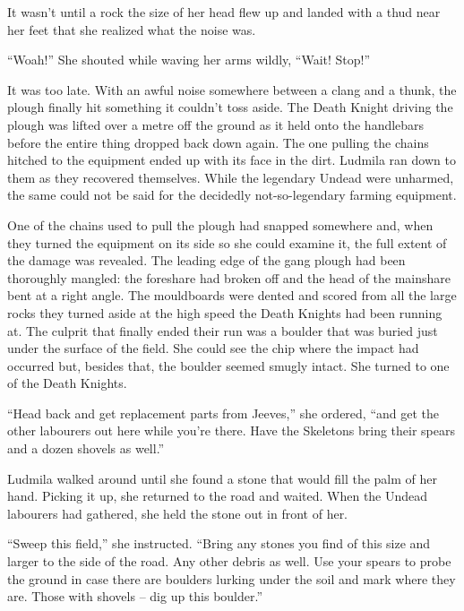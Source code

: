  

It wasn’t until a rock the size of her head flew up and landed with a thud near her feet that she realized what the noise was.

 

“Woah!” She shouted while waving her arms wildly, “Wait! Stop!”

 

It was too late. With an awful noise somewhere between a clang and a thunk, the plough finally hit something it couldn’t toss aside. The Death Knight driving the plough was lifted over a metre off the ground as it held onto the handlebars before the entire thing dropped back down again. The one pulling the chains hitched to the equipment ended up with its face in the dirt. Ludmila ran down to them as they recovered themselves. While the legendary Undead were unharmed, the same could not be said for the decidedly not-so-legendary farming equipment.

 

One of the chains used to pull the plough had snapped somewhere and, when they turned the equipment on its side so she could examine it, the full extent of the damage was revealed. The leading edge of the gang plough had been thoroughly mangled: the foreshare had broken off and the head of the mainshare bent at a right angle. The mouldboards were dented and scored from all the large rocks they turned aside at the high speed the Death Knights had been running at. The culprit that finally ended their run was a boulder that was buried just under the surface of the field. She could see the chip where the impact had occurred but, besides that, the boulder seemed smugly intact. She turned to one of the Death Knights.

 

“Head back and get replacement parts from Jeeves,” she ordered, “and get the other labourers out here while you’re there. Have the Skeletons bring their spears and a dozen shovels as well.”

 

Ludmila walked around until she found a stone that would fill the palm of her hand. Picking it up, she returned to the road and waited. When the Undead labourers had gathered, she held the stone out in front of her.

 

“Sweep this field,” she instructed. “Bring any stones you find of this size and larger to the side of the road. Any other debris as well. Use your spears to probe the ground in case there are boulders lurking under the soil and mark where they are. Those with shovels – dig up this boulder.”

